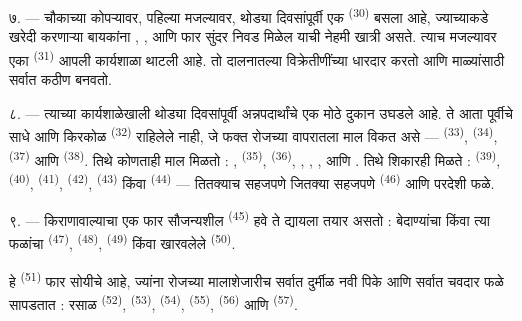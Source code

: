 ७. --- चौकाच्या कोपऱ्यावर, पहिल्या मजल्यावर, थोड्या दिवसांपूर्वी एक 
\textsuperscript{(30)} बसला आहे, ज्याच्याकडे खरेदी करणाऱ्या बायकांना ,
,  आणि  फार सुंदर निवड मिळेल याची नेहमी
खात्री असते. त्याच मजल्यावर एका  \textsuperscript{(31)} आपली
कार्यशाळा थाटली आहे. तो दालनातल्या विक्रेतीणींच्या  धारदार करतो आणि माळ्यांसाठी
सर्वात कठीण   बनवतो.

\VUsaut{4.0mm}
\VUsaut{3.0mm}

८. --- त्याच्या कार्यशाळेखाली थोड्या दिवसांपूर्वी अन्नपदार्थांचे एक मोठे दुकान उघडले आहे. ते
आता पूर्वीचे साधे आणि किरकोळ  \textsuperscript{(32)} राहिलेले नाही, जे
फक्त रोजच्या वापरातला माल विकत असे —  \textsuperscript{(33)}, 
\textsuperscript{(34)},  \textsuperscript{(37)} आणि 
\textsuperscript{(38)}. तिथे कोणताही माल मिळतो : ,
 \textsuperscript{(35)},  \textsuperscript{(36)},
, , ,  आणि .
तिथे शिकारही मिळते :  \textsuperscript{(39)}, 
\textsuperscript{(40)},  \textsuperscript{(41)}, 
\textsuperscript{(42)},  \textsuperscript{(43)} किंवा 
\textsuperscript{(44)} — तितक्याच सहजपणे जितक्या सहजपणे 
\textsuperscript{(46)} आणि  परदेशी फळे.

९. --- किराणावाल्याचा एक फार सौजन्यशील  \textsuperscript{(45)} हवे ते द्यायला
तयार असतो : बेदाण्यांचा किंवा त्या फळांचा  \textsuperscript{(47)},
 \textsuperscript{(48)},  \textsuperscript{(49)}
किंवा खारवलेले  \textsuperscript{(50)}.

हे  \textsuperscript{(51)} फार सोयीचे आहे, ज्यांना रोजच्या
मालाशेजारीच सर्वात दुर्मीळ नवी पिके आणि सर्वात चवदार फळे सापडतात : रसाळ 
\textsuperscript{(52)},  \textsuperscript{(53)}, 
\textsuperscript{(54)},  \textsuperscript{(55)}, 
\textsuperscript{(56)} आणि  \textsuperscript{(57)}.

\VUsaut{4.0mm}
\VUsaut{3.0mm}

